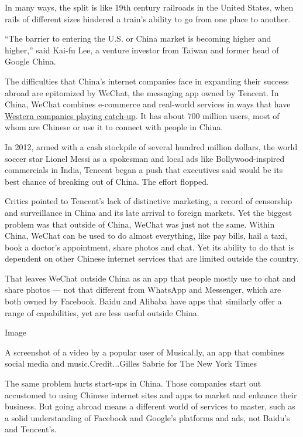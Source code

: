 In many ways, the split is like 19th century railroads in the United
States, when rails of different sizes hindered a train's ability to go
from one place to another.

``The barrier to entering the U.S. or China market is becoming higher
and higher,'' said Kai-fu Lee, a venture investor from Taiwan and former
head of Google China.

The difficulties that China's internet companies face in expanding their
success abroad are epitomized by WeChat, the messaging app owned by
Tencent. In China, WeChat combines e-commerce and real-world services in
ways that have
\href{http://www.nytimes.com/2016/08/03/technology/china-mobile-tech-innovation-silicon-valley.html}{Western
companies playing catch-up}. It has about 700 million users, most of
whom are Chinese or use it to connect with people in China.

In 2012, armed with a cash stockpile of several hundred million dollars,
the world soccer star Lionel Messi as a spokesman and local ads like
Bollywood-inspired commercials in India, Tencent began a push that
executives said would be its best chance of breaking out of China. The
effort flopped.

Critics pointed to Tencent's lack of distinctive marketing, a record of
censorship and surveillance in China and its late arrival to foreign
markets. Yet the biggest problem was that outside of China, WeChat was
just not the same. Within China, WeChat can be used to do almost
everything, like pay bills, hail a taxi, book a doctor's appointment,
share photos and chat. Yet its ability to do that is dependent on other
Chinese internet services that are limited outside the country.

That leaves WeChat outside China as an app that people mostly use to
chat and share photos --- not that different from WhatsApp and
Messenger, which are both owned by Facebook. Baidu and Alibaba have apps
that similarly offer a range of capabilities, yet are less useful
outside China.

Image

A screenshot of a video by a popular user of Musical.ly, an app that
combines social media and music.Credit...Gilles Sabrie for The New York
Times

The same problem hurts start-ups in China. Those companies start out
accustomed to using Chinese internet sites and apps to market and
enhance their business. But going abroad means a different world of
services to master, such as a solid understanding of Facebook and
Google's platforms and ads, not Baidu's and Tencent's.

